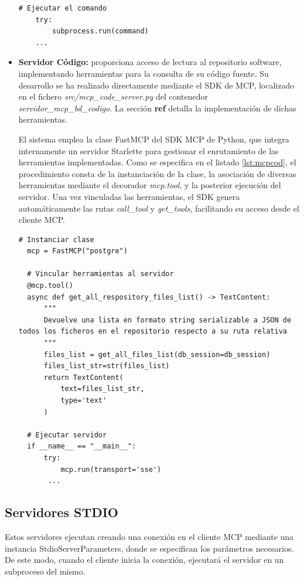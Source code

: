 \begin{itemize}
\begin{lstlisting}[caption={\textit{launch\_mcp\_server\_confluence.py}: ejecución de lanzamiento del servidor MCP Confluence},label={lst:servconf}]
    # Ejecutar el comando
    try:
        subprocess.run(command)
    ...
\end{lstlisting}

\item\textbf{Servidor Código: }proporciona acceso de lectura al repositorio software, implementando herramientas para la consulta de su código fuente. Su desarrollo se ha realizado directamente mediante el SDK de MCP, localizado en el fichero \textit{src/mcp\_code\_server.py} del contenedor \textit{servidor\_mcp\_bd\_codigo}. La sección \textbf{ref} detalla la implementación de dichas herramientas.

El sistema emplea la clase FastMCP del SDK MCP de Python, que integra internamente un servidor Starlette para gestionar el enrutamiento de las herramientas implementadas. Como se especifica en el listado \ref{lst:mcpcod}, el procedimiento consta de la instanciación de la clase, la asociación de diversas herramientas mediante el decorador \textit{mcp.tool}, y la posterior ejecución del servidor. Una vez vinculadas las herramientas, el SDK genera automáticamente las rutas \textit{call\_tool} y \textit{get\_tools}, facilitando su acceso desde el cliente MCP.

\begin{lstlisting}[caption={\textit{mcp\_code\_server.py: ejecución del servidor MCP con acceso al código fuente}},label={lst:mcpcod}]
  # Instanciar clase 
  mcp = FastMCP("postgre")

  # Vincular herramientas al servidor
  @mcp.tool()
  async def get_all_respository_files_list() -> TextContent:
      """
      Devuelve una lista en formato string serializable a JSON de todos los ficheros en el repositorio respecto a su ruta relativa
      """
      files_list = get_all_files_list(db_session=db_session)
      files_list_str=str(files_list)
      return TextContent(
          text=files_list_str,
          type='text'
      )

  # Ejecutar servidor
  if __name__ == "__main__":
      try:
          mcp.run(transport='sse')
       ...

\end{lstlisting}


\end{itemize}

\subsection{Servidores STDIO}
\label{sec:stdio}
Estos servidores ejecutan creando una conexión en el cliente MCP mediante una instancia StdioServerParameters, donde se especifican los parámetros necesarios. De este modo, cuando el cliente inicia la conexión, ejecutará el servidor en un subproceso del mismo.

